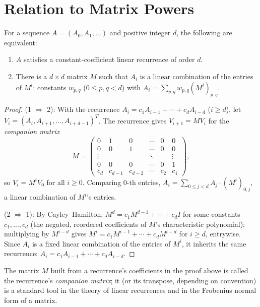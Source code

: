 \documentclass[11pt]{article}
\begin{document}
\section{Relation to Matrix Powers}
\begin{theorembox}
For a sequence $A=(A_0,A_1,\ldots)$ and positive integer $d$, the
following are equivalent:
\begin{enumerate}[leftmargin=1.7em]
  \item $A$ satisfies a constant-coefficient linear recurrence of order
        $d$.
  \item There is a $d\times d$ matrix $M$ such that $A_i$ is a linear
        combination of the entries of $M^i$: constants $w_{p,q}$
        ($0\le p,q<d$) with $A_i = \sum_{p,q} w_{p,q}(M^i)_{p,q}$.
\end{enumerate}
\end{theorembox}
\begin{proof}
(1 $\Rightarrow$ 2): With the recurrence
$A_i=c_1A_{i-1}+\cdots+c_dA_{i-d}$ ($i\ge d$), let $V_i =
(A_i,A_{i+1},\ldots,A_{i+d-1})^T$. The recurrence gives $V_{i+1}=MV_i$
for the \emph{companion matrix}
\[
  M = \begin{pmatrix}
    0&1&0&\cdots&0&0\\
    0&0&1&\cdots&0&0\\
    \vdots&&&\ddots&&\vdots\\
    0&0&0&\cdots&0&1\\
    c_d&c_{d-1}&c_{d-2}&\cdots&c_2&c_1
  \end{pmatrix},
\]
so $V_i = M^iV_0$ for all $i\ge 0$. Comparing $0$-th entries,
$A_i = \sum_{0\le j<d} A_j\cdot(M^i)_{0,j}$, a linear combination of
$M^i$'s entries.

(2 $\Rightarrow$ 1): By Cayley--Hamilton, $M^d = c_1M^{d-1}+\cdots+c_dI$
for some constants $c_1,\ldots,c_d$ (the negated, reordered coefficients
of $M$'s characteristic polynomial); multiplying by $M^{i-d}$ gives
$M^i = c_1M^{i-1}+\cdots+c_dM^{i-d}$ for $i\ge d$, entrywise. Since $A_i$
is a fixed linear combination of the entries of $M^i$, it inherits the
same recurrence: $A_i = c_1A_{i-1}+\cdots+c_dA_{i-d}$.
\end{proof}

\begin{notebox}
The matrix $M$ built from a recurrence's coefficients in the proof above
is called the recurrence's \emph{companion matrix}; it (or its
transpose, depending on convention) is a standard tool in the theory of
linear recurrences and in the Frobenius normal form of a matrix.
\end{notebox}
\end{document}
